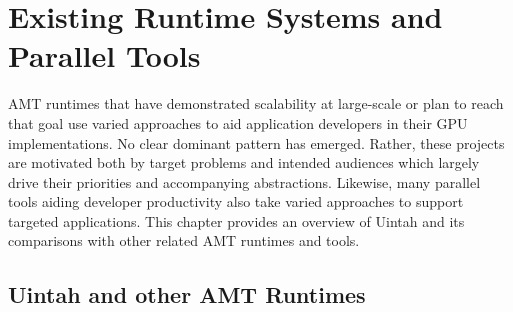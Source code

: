 \documentclass[12pt]{article}
\begin{document}
\begin{abstract}
An overview of other runtimes and parallel tools is given in Chapter \ref{ch:related}.  Chapter \ref{ch:uintah_prior} describes the prior state of Uintah's GPU runtime.  Chapter \ref{ch:uintah_current} outlines work completed to date.  Chapter \ref{ch:workplan} provides remaining work required to meet the goals of this thesis.  Chapter \ref{ch:thesis_format} outlines the proposed thesis format.  Chapter \ref{ch:thesis_plan} gives a thesis plan.  The remainder of this document contains the conclusion, references, and a list of my publications.   

\end{abstract}

\pagebreak
\tableofcontents
\pagebreak

\cleardoublepage
{}




\section{Existing Runtime Systems and Parallel Tools}
\label{ch:related}

AMT runtimes that have demonstrated scalability at large-scale or plan to reach that goal use varied approaches to aid application developers in their GPU implementations.   No clear dominant pattern has emerged.  Rather, these projects are motivated both by target problems and intended audiences which largely drive their priorities and accompanying abstractions.  Likewise, many parallel tools aiding developer productivity also take varied approaches to support targeted applications.  This chapter provides an overview of Uintah and its comparisons with other related AMT runtimes and tools.  

\subsection{Uintah and other AMT Runtimes}
\label{ch:amt_runtimes}
\end{document}
